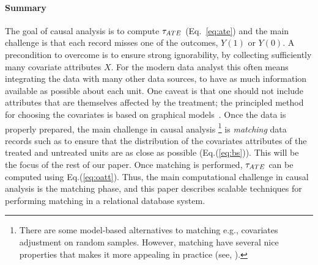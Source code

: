 



\paragraph*{\bf{Summary}}
The goal of causal analysis is to compute ${\tau_{ATE}}$ (Eq.~\ref{eq:ate})
and the main challenge is that each record misses one of the outcomes,
$Y(1)$ or $Y(0)$.  A precondition to overcome is to ensure strong
ignorability, by collecting sufficiently many covariate attributes
$X$.  For the modern data analyst this often means integrating the
data with many other data sources, to have as much information
available as possible about each unit.  One caveat is that one should
not include attributes that are themselves affected by the treatment;
the principled method for choosing the covariates is based on
graphical models~\cite{de2011covariate}.  Once the data is properly
prepared, the main challenge in causal analysis  \footnote{There are
  some model-based alternatives to matching e.g., covariates
  adjustment on random samples.  However, matching have several nice
  properties that makes it more appealing in practice (see,
  \cite{Rubin1983b}).} is {\em matching} data records such as to
ensure that the distribution of the covariates attributes of the
treated and untreated units are as close as possible
(Eq.(\ref{eq:bs})).  This will be the focus of the rest of our paper.
Once matching is performed, ${\tau_{ATE}}$ can be computed using
Eq.(\ref{eq:oatt}).  Thus, the main computational challenge in causal
analysis is the matching phase, and this paper describes scalable
techniques for performing matching in a relational database system.

